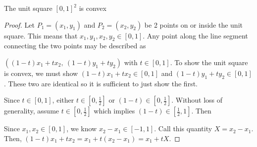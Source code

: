 \begin{example}[A region in $\R^2$]
    The unit square $[0,1]^2$ is convex
    \begin{proof}
        Let $P_1=(x_1,y_1)$ and $P_2=(x_2,y_2)$ be 2 points on or inside the unit square. This means that $x_1,y_1,x_2,y_2\in[0,1]$. Any point along the line segment connecting the two points may be described as \par$((1-t)x_1+tx_2,\ (1-t)y_1+ty_2)$ with $t\in[0,1]$. To show the unit square is convex, we must show $(1-t)x_1+tx_2\in[0,1]$ and $(1-t)y_1+ty_2\in[0,1]$. These two are identical so it is sufficient to just show the first.\par

        Since $t\in[0,1]$, either $t\in[0,\frac{1}{2}]$ or $(1-t)\in[0,\frac{1}{2}]$. Without loss of generality, assume $t\in[0,\frac{1}{2}]$ which implies $(1-t)\in[\frac{1}{2},1]$. Then 
        
        Since $x_1,x_2\in[0,1]$, we know $x_2-x_1\in[-1,1]$. Call this quantity $X=x_2-x_1$. Then, $(1-t)x_1+tx_2 = x_1 + t(x_2-x_1)=x_1+tX$. 
    \end{proof}
\end{example}
